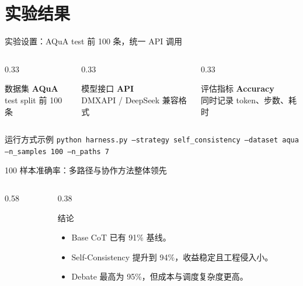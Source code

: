 \documentclass[10pt,aspectratio=169]{beamer}
\newcommand{\tightitems}{\setlength{\itemsep}{0.24em}}
\newcommand{\metric}[3]{%
  \begin{block}{#1}
    \centering
    {\LARGE\bfseries #2}\\[-0.1em]
    {\scriptsize\textcolor{Muted}{#3}}
  \end{block}
}
\begin{document}
\section{实验结果}

\begin{frame}{实验设置：AQuA test 前 100 条，统一 API 调用}
  \begin{columns}[T,onlytextwidth]
    \begin{column}{0.33\textwidth}
      \metric{数据集}{AQuA}{test split 前 100 条}
    \end{column}
    \begin{column}{0.33\textwidth}
      \metric{模型接口}{API}{DMXAPI / DeepSeek 兼容格式}
    \end{column}
    \begin{column}{0.33\textwidth}
      \metric{评估指标}{Accuracy}{同时记录 token、步数、耗时}
    \end{column}
  \end{columns}

  \vspace{0.6em}
  \begin{block}{运行方式示例}
    \small
    \texttt{python harness.py --strategy self\_consistency --dataset aqua --n\_samples 100 --n\_paths 7}
  \end{block}
\end{frame}

\begin{frame}{100 样本准确率：多路径与协作方法整体领先}
  \begin{columns}[T,onlytextwidth]
    \begin{column}{0.58\textwidth}
    \end{column}
    \begin{column}{0.38\textwidth}
      \begin{block}{结论}
        \begin{itemize}
          \tightitems
          \item Base CoT 已有 91\% 基线。
          \item Self-Consistency 提升到 94\%，收益稳定且工程侵入小。
          \item Debate 最高为 95\%，但成本与调度复杂度更高。
        \end{itemize}
      \end{block}
    \end{column}
  \end{columns}
\end{frame}
\end{document}

